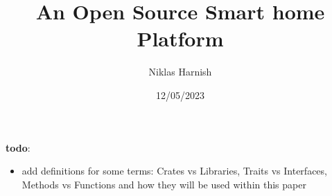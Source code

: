 \documentclass{LULCSProject}
\title{An Open Source Smart home Platform}
\author{Niklas Harnish}
\date{12/05/2023}
\begin{document}
\maketitle


\tableofcontents

\listoffigures
\newpage
\listoftables

\newpage
\textbf{todo}:
\begin{itemize}
    \item add definitions for some terms: Crates vs Libraries, Traits vs Interfaces, Methods vs Functions and how they will be used within this paper
\end{itemize}

\pagebreak
{}



\newpage


\newpage


\newpage


\newpage


\newpage


\newpage


\newpage
\appendix

\newpage

\end{document}
